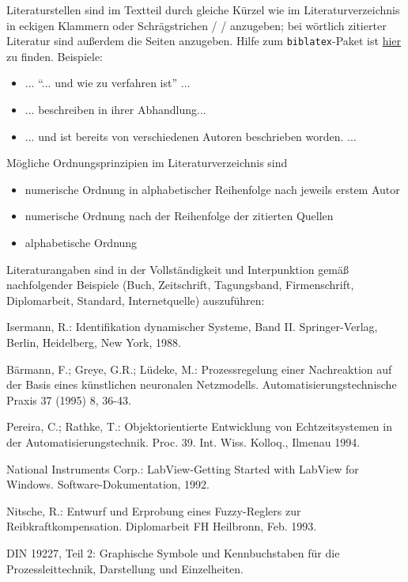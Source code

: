 Literaturstellen sind im Textteil durch gleiche Kürzel wie im
Literaturverzeichnis in eckigen Klammern oder Schrägstrichen / / anzugeben; bei
wörtlich zitierter Literatur sind außerdem die Seiten anzugeben. Hilfe zum
\verb-biblatex--Paket ist \href{http://mirror.ctan.org/macros/latex/contrib/biblatex/doc/biblatex.pdf}{hier}
zu finden. Beispiele:
\begin{itemize}
  \item ... "`... und wie zu verfahren ist"' \citep[S. 211]{w3c_svg} ...
  \item ... \citet{gme_overview} beschreiben in ihrer Abhandlung...
  \item ... und ist bereits von verschiedenen Autoren beschrieben worden. \citep{xvcml-indin2007,frankel,steinberg_emf_2008} ...
\end{itemize}
Mögliche Ordnungsprinzipien im Literaturverzeichnis sind
\begin{itemize}
  \item numerische Ordnung in alphabetischer Reihenfolge nach jeweils erstem Autor
  \item numerische Ordnung nach der Reihenfolge der zitierten Quellen
  \item alphabetische Ordnung
\end{itemize}
Literaturangaben sind in der Vollständigkeit und Interpunktion gemäß nachfolgender Beispiele (Buch, Zeitschrift, Tagungsband, Firmenschrift, Diplomarbeit, Standard, Internetquelle) auszuführen:
\cite{asl}
\begin{description}
  \item Isermann, R.: Identifikation dynamischer Systeme, Band II.
  Springer-Verlag, Berlin, Heidelberg, New York, 1988.
  \item Bärmann, F.;  Greye, G.R.; Lüdeke, M.: Prozessregelung einer Nachreaktion auf der Basis eines künstlichen neuronalen Netzmodells. Automatisierungstechnische Praxis 37 (1995) 8, 36-43.
  \item Pereira, C.;  Rathke, T.: Objektorientierte Entwicklung von Echtzeitsystemen in der Automatisierungstechnik. Proc. 39. Int. Wiss. Kolloq., Ilmenau 1994.
  \item  National Instruments Corp.: LabView-Getting Started with LabView for Windows. Software-Dokumentation, 1992.
  \item Nitsche, R.: Entwurf und Erprobung eines Fuzzy-Reglers zur Reibkraftkompensation. Diplomarbeit FH Heilbronn, Feb. 1993.
  \item DIN 19227, Teil 2: Graphische Symbole und Kennbuchstaben für die Prozessleittechnik, Darstellung und Einzelheiten.
\end{description}

